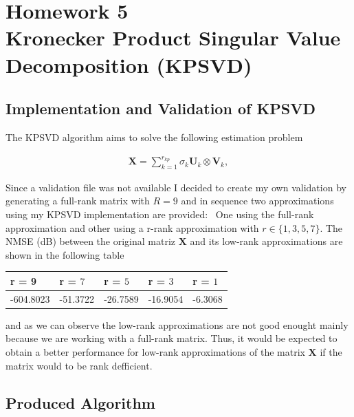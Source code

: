 \documentclass[a4paper,10pt]{article}
\begin{document}
\newpage
\section*{Homework 5 \\ Kronecker Product Singular Value Decomposition (KPSVD)}

    \subsection*{Implementation and Validation of KPSVD}

    The KPSVD algorithm aims to solve the following estimation problem 

    \begin{align}
        \boldsymbol{X} = \sum^{r_{kp}}_{k = 1} \sigma_{k} \boldsymbol{U}_{k} \otimes \boldsymbol{V}_{k},
    \end{align}

    Since a validation file was not available I decided to create my own validation by generating a full-rank matrix with $R = 9$ and in sequence two approximations using my KPSVD implementation are provided: \
    One using the full-rank approximation and other using a r-rank approximation with $r \in \{1,3,5,7\}$. The NMSE (dB) between the original matriz $\boldsymbol{X}$ and its low-rank approximations are 
    shown in the following table

    \begin{table}[ht!]
        \centering
        \begin{tabular}{|l|l|l|l|l|}
        \hline
        r = 9 & r = $7$ & r = $5$ & r = $3$ & r = $1$ \\ \hline
        -604.8023 & -51.3722 & -26.7589 & -16.9054 & -6.3068 \\ \hline
        \end{tabular}
    \end{table}

    and as we can observe the low-rank approximations are not good enought mainly because we are working with a full-rank matrix. Thus, it would be expected to obtain a better
    performance for low-rank approximations of the matrix $\boldsymbol{X}$ if the matrix would to be rank defficient.

    \subsection*{Produced Algorithm}
\end{document}

